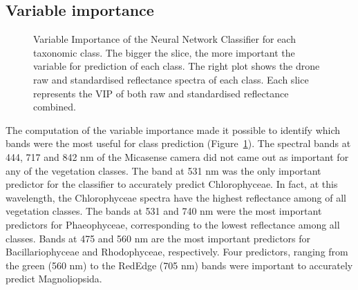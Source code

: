 \documentclass[
  number]{elsarticle}
\begin{document}
\subsection{Variable importance}\label{variable-importance}

\label{cell-fig-VIP}
\begin{figure}[H]


\caption{\label{fig-VIP}Variable Importance of the Neural Network
Classifier for each taxonomic class. The bigger the slice, the more
important the variable for prediction of each class. The right plot
shows the drone raw and standardised reflectance spectra of each class.
Each slice represents the VIP of both raw and standardised reflectance
combined.}

\end{figure}%

The computation of the variable importance made it possible to identify
which bands were the most useful for class prediction
(Figure~\ref{fig-VIP}). The spectral bands at 444, 717 and 842 nm of the
Micasense camera did not came out as important for any of the vegetation
classes. The band at 531 nm was the only important predictor for the
classifier to accurately predict Chlorophyceae. In fact, at this
wavelength, the Chlorophyceae spectra have the highest reflectance among
of all vegetation classes. The bands at 531 and 740 nm were the most
important predictors for Phaeophyceae, corresponding to the lowest
reflectance among all classes. Bands at 475 and 560 nm are the most
important predictors for Bacillariophyceae and Rhodophyceae,
respectively. Four predictors, ranging from the green (560 nm) to the
RedEdge (705 nm) bands were important to accurately predict
Magnoliopsida.
\end{document}

